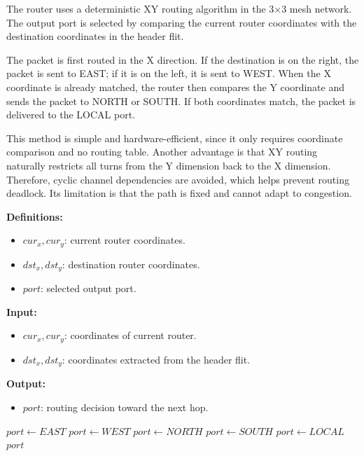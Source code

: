 The router uses a deterministic XY routing algorithm in the 3×3 mesh network. The output port is selected by comparing the current router coordinates with the destination coordinates in the header flit.

The packet is first routed in the X direction. If the destination is on the right, the packet is sent to EAST; if it is on the left, it is sent to WEST. When the X coordinate is already matched, the router then compares the Y coordinate and sends the packet to NORTH or SOUTH. If both coordinates match, the packet is delivered to the LOCAL port.

This method is simple and hardware-efficient, since it only requires coordinate comparison and no routing table. Another advantage is that XY routing naturally restricts all turns from the Y dimension back to the X dimension. Therefore, cyclic channel dependencies are avoided, which helps prevent routing deadlock. Its limitation is that the path is fixed and cannot adapt to congestion.

\begin{algorithm}[htbp]
\caption{Pseudo code of the XY-routing computation}
\label{alg:xy_routing}
\textbf{Definitions:}

\begin{itemize}
    \item $cur_x, cur_y$: current router coordinates.
    \item $dst_x, dst_y$: destination router coordinates.
    \item $port$: selected output port.
\end{itemize}

\textbf{Input:}

\begin{itemize}
    \item $cur_x, cur_y$: coordinates of current router.
    \item $dst_x, dst_y$: coordinates extracted from the header flit.
\end{itemize}

\textbf{Output:}

\begin{itemize}
    \item $port$: routing decision toward the next hop.
\end{itemize}

\begin{algorithmic}[1]
    \State $port \gets EAST$
    \State $port \gets WEST$
    \State $port \gets NORTH$
    \State $port \gets SOUTH$
\Else
    \State $port \gets LOCAL$
\EndIf
\State \Return $port$
\end{algorithmic}
\end{algorithm}

